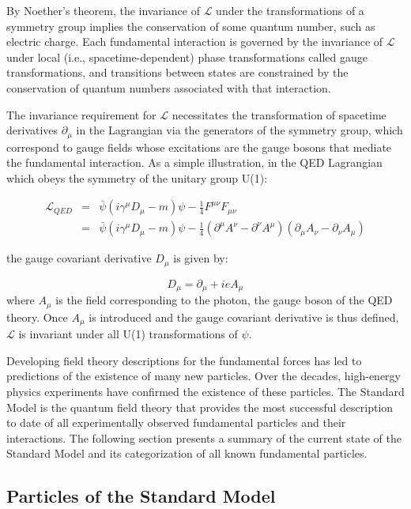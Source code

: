 By Noether's theorem, the invariance of $\mathcal{L}$ under the transformations of a symmetry group implies the conservation of some quantum number, such as electric charge. Each fundamental interaction is governed by the invariance of $\mathcal{L}$ under local (i.e., spacetime-dependent) phase transformations called gauge transformations, and transitions between states are constrained by the conservation of quantum numbers associated with that interaction.

The invariance requirement for $\mathcal{L}$ necessitates the transformation of spacetime derivatives $\partial_{\mu}$ in the Lagrangian via the generators of the symmetry group, which correspond to gauge fields whose excitations are the gauge bosons that mediate the fundamental interaction. As a simple illustration, in the QED Lagrangian which obeys the symmetry of the unitary group U(1):

\begin{eqnarray}
\mathcal{L}_{QED} &=& \bar{\psi}(i\gamma^{\mu}D_{\mu} - m)\psi -\frac{1}{4}F^{\mu\nu}F_{\mu\nu} \nonumber \\
    &=& \bar{\psi}(i\gamma^{\mu}D_{\mu} - m)\psi -\frac{1}{4}(\partial^{\mu}A^{\nu} - \partial^{\nu}A^{\mu})(\partial_{\mu}A_{\nu} - \partial_{\nu}A_{\mu})
\label{eq:QEDLagrangian}
\end{eqnarray}

the gauge covariant derivative $D_{\mu}$ is given by:

\begin{equation}
D_{\mu} = \partial_{\mu} + ieA_{\mu}
\label{eq:covariant-derivative}
\end{equation}
where $A_{\mu}$ is the field corresponding to the photon, the gauge boson of the QED theory. Once $A_{\mu}$ is introduced and the gauge covariant derivative is thus defined, $\mathcal{L}$ is invariant under all U(1) transformations of $\psi$.

Developing field theory descriptions for the fundamental forces has led to predictions of the existence of many new particles. Over the decades, high-energy physics experiments have confirmed the existence of these particles. The Standard Model is the quantum field theory that provides the most successful description to date of all experimentally observed fundamental particles and their interactions. The following section presents a summary of the current state of the Standard Model and its categorization of all known fundamental particles.

\subsection{Particles of the Standard Model\label{sec:SM-particles}}

